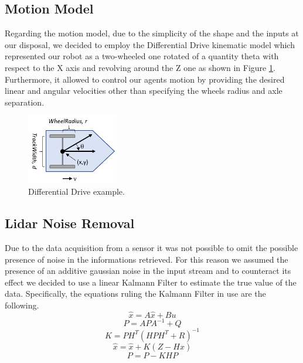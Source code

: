 \documentclass[twocolumn, a4paper]{article}
\begin{document}
\subsection{Motion Model}
Regarding the motion model, due to the simplicity of the shape and the inputs
at our disposal, we decided to employ the Differential Drive kinematic model
which represented our robot as a two-wheeled one rotated of a quantity theta with 
respect to the X axis and revolving around the Z one as shown in Figure
\ref{fig:Motion_model}. Furthermore, it allowed
to control our agents motion by providing the desired linear
and angular velocities other than specifying the wheels radius and axle
separation.
\begin{figure}[h]
    \centering
    \includegraphics[width=4cm]{"../Report_images/diffdrive_model_matlab"}
    \caption{Differential Drive example.}
    \label{fig:Motion_model}
\end{figure}
\subsection{Lidar Noise Removal}
Due to the data acquisition from a sensor it was not possible to
omit the possible presence of noise in the informations retrieved.
For this reason we assumed the presence of an additive gaussian noise in
the input stream and to counteract its effect we decided to
use a linear Kalmann Filter to estimate the true value of the data.
Specifically, the equations ruling the Kalmann Filter in use are the following.
\begin{equation}
    \hat{x} = A\hat{x} + Bu
\end{equation}
\begin{equation}
    P = APA^{-1} + Q
\end{equation}
\begin{equation}
    K = PH^{T}(HPH^{T} + R)^{-1}
\end{equation}
\begin{equation}
    \hat{x} = \hat{x} + K(Z - H\hat{x})  
\end{equation}
\begin{equation}
    P = P - KHP  
\end{equation}
\end{document}

